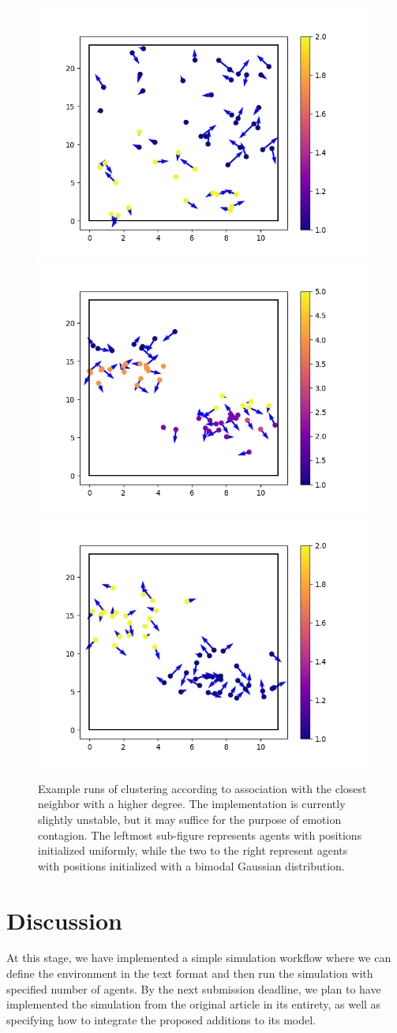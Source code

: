 \documentclass[9pt]{pnas-new}
\begin{document}
\begin{figure}[h!]
    \centering
    \includegraphics[width=0.3\linewidth]{fig/Figure_2.png}
    \hfill
    \includegraphics[width=0.3\linewidth]{fig/Figure_3.png}
    \hfill
    \includegraphics[width=0.3\linewidth]{fig/Figure_4.png}
    \caption{Example runs of clustering according to association with the closest neighbor with a higher degree. The implementation is currently slightly unstable, but it may suffice for the purpose of emotion contagion. The leftmost sub-figure represents agents with positions initialized uniformly, while the two to the right represent agents with positions initialized with a bimodal Gaussian distribution.}
    \label{fig:enter-label}
\end{figure}

\section{Discussion}
At this stage, we have implemented a simple simulation workflow where we can define the environment in the text format and then run the simulation with specified number of agents. By the next submission deadline, we plan to have implemented the simulation from the original article in its entirety, as well as specifying how to integrate the proposed additions to its model.
\end{document}
